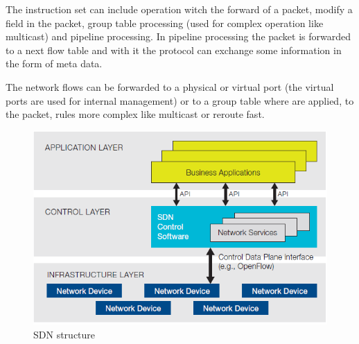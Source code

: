 The instruction set can include operation witch the forward of a packet, modify a field in the packet, group table processing (used for complex operation like multicast) and pipeline processing. In pipeline processing the packet is forwarded to a next flow table and with it the protocol can exchange some information in the form of meta data.

The network flows can be forwarded to a physical or virtual port (the virtual ports are used for internal management) or to a group table where are applied, to the packet, rules more complex like multicast or reroute fast.

\begin{figure}
\centering
\includegraphics[scale=0.4]{Introduction/Image/SDNStructure.png}
\caption{\ac{SDN} structure}
\label{fig:sdn-and-openflow-overview:sdn-structure}
\end{figure}